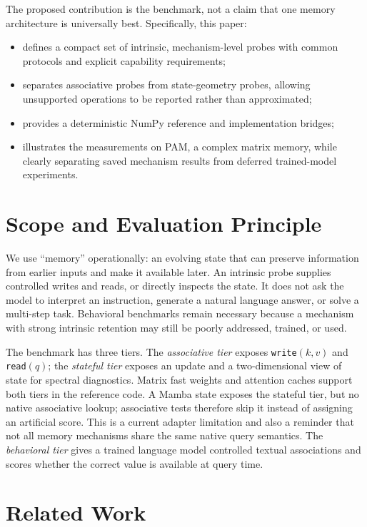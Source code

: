\documentclass[10pt,twocolumn]{article}
\newcommand{\pam}{\textsc{PAM}}
\begin{document}
The proposed contribution is the benchmark, not a claim that one memory
architecture is universally best.  Specifically, this paper:
\begin{itemize}
  \item defines a compact set of intrinsic, mechanism-level probes with common
        protocols and explicit capability requirements;
  \item separates associative probes from state-geometry probes, allowing
        unsupported operations to be reported rather than approximated;
  \item provides a deterministic NumPy reference and implementation bridges;
  \item illustrates the measurements on \pam, a complex matrix memory, while
        clearly separating saved mechanism results from deferred trained-model
        experiments.
\end{itemize}

\section{Scope and Evaluation Principle}
\label{sec:scope}

We use ``memory'' operationally: an evolving state that can preserve
information from earlier inputs and make it available later.  An intrinsic
probe supplies controlled writes and reads, or directly inspects the state.
It does not ask the model to interpret an instruction, generate a natural
language answer, or solve a multi-step task.  Behavioral benchmarks remain
necessary because a mechanism with strong intrinsic retention may still be
poorly addressed, trained, or used.

The benchmark has three tiers.  The \emph{associative tier} exposes
\texttt{write}$(k,v)$ and \texttt{read}$(q)$; the \emph{stateful tier} exposes
an update and a two-dimensional view of state for spectral diagnostics.
Matrix fast weights and attention caches support both tiers in the reference
code.  A Mamba state exposes the stateful tier, but no native associative
lookup; associative tests therefore skip it instead of assigning an artificial
score.  This is a current adapter limitation and also a reminder that not all
memory mechanisms share the same native query semantics.  The
\emph{behavioral tier} gives a trained language model controlled textual
associations and scores whether the correct value is available at query time.

\section{Related Work}
\label{sec:related}
\end{document}
